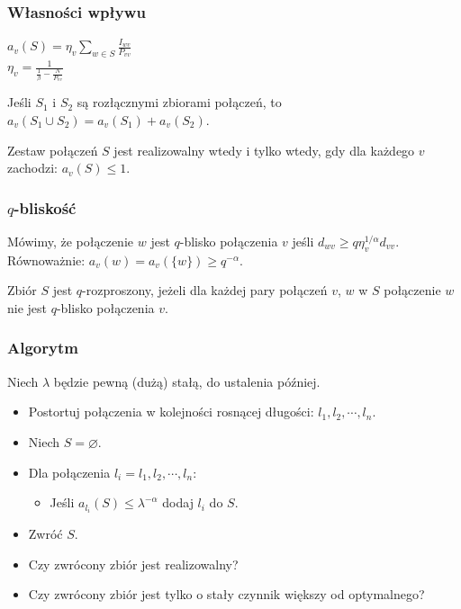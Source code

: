\documentclass[polish, t,10pt]{beamer}
\begin{document}
\begin{frame}
    \frametitle{Własności wpływu}
    \begin{definition}
        $a_v(S) = \eta_v \sum_{w \in S} \frac{I_{wv}}{P_{vv}}$\\
        $\eta_v = \frac{1}{\frac{1}{\beta} - \frac{N}{P_{vv}}}$
    \end{definition}
    \begin{lemma}
        Jeśli $S_1$ i $S_2$ są rozłącznymi zbiorami połączeń, to $a_v(S_1 \cup S_2) = a_v(S_1) + a_v(S_2)$.
    \end{lemma}
    \begin{lemma}
        Zestaw połączeń $S$ jest realizowalny wtedy i tylko wtedy, gdy dla każdego $v$ zachodzi:
        $a_v(S) \le 1$.
    \end{lemma}
\end{frame}

\begin{frame}
    \frametitle{$q$-bliskość}
    \begin{definition}
        Mówimy, że połączenie $w$ jest $q$-blisko połączenia $v$ jeśli $d_{wv} \ge q \eta_v^{1/\alpha} d_{vv}$.
        Równoważnie: $a_v(w) = a_v(\{w\}) \ge q^{-\alpha}$.
    \end{definition}

    \begin{definition}
        Zbiór $S$ jest $q$-rozproszony, jeżeli dla każdej pary połączeń $v$, $w$ w $S$ połączenie $w$ nie jest $q$-blisko połączenia $v$.
    \end{definition}
\end{frame}

\begin{frame}
    \frametitle{Algorytm}
    Niech $\lambda$ będzie pewną (dużą) stałą, do ustalenia później.
    \begin{itemize}
        \item Postortuj połączenia w kolejności rosnącej długości: $l_1, l_2, \cdots, l_n$.
        \item Niech $S = \varnothing$.
        \item Dla połączenia $l_i = l_1, l_2, \cdots, l_n$: 
        \begin{itemize}
            \item Jeśli $a_{l_i}(S) \le \lambda^{-\alpha}$ dodaj $l_i$ do $S$.
        \end{itemize}
        \item Zwróć $S$.
    \end{itemize}
    \pause
    \vfill
    \begin{itemize}
        \item Czy zwrócony zbiór jest realizowalny?
        \pause
        \item Czy zwrócony zbiór jest tylko o stały czynnik większy od optymalnego?
    \end{itemize}
\end{frame}
\end{document}
